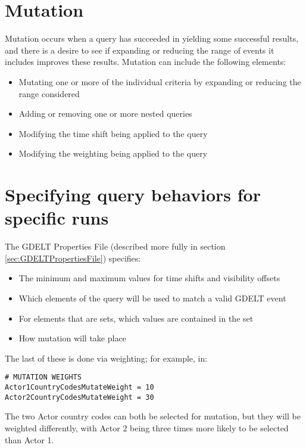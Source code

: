 \section{Mutation}
\par Mutation occurs when a query has succeeded in yielding some successful results, and there is a desire to see if expanding or reducing the range of events it includes improves these results. Mutation can include the following elements:

\begin{itemize}
  \item Mutating one or more of the individual criteria by expanding or reducing the range considered
  \item Adding or removing one or more nested queries
  \item Modifying the time shift being applied to the query
  \item Modifying the weighting being applied to the query
\end{itemize}

\section{Specifying query behaviors for specific runs}
The GDELT Properties File (described more fully in section \ref{sec:GDELTPropertiesFile}) specifies:

\begin{itemize}
\item The minimum and maximum values for time shifts and visibility offsets
\item Which elements of the query will be used to match a valid GDELT event
\item For elements that are sets, which values are contained in the set
\item How mutation will take place
\end{itemize}

The last of these is done via weighting; for example, in:

\begin{lstlisting}
# MUTATION WEIGHTS
Actor1CountryCodesMutateWeight = 10
Actor2CountryCodesMutateWeight = 30
\end{lstlisting}

The two Actor country codes can both be selected for mutation, but they will be weighted differently, with Actor 2 being three times more likely to be selected than Actor 1.